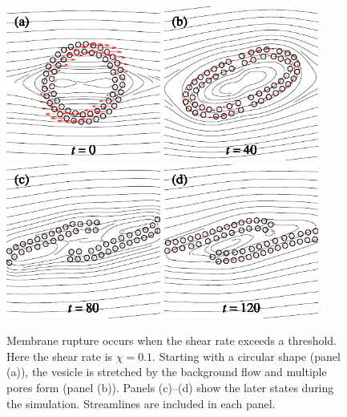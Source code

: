 \documentclass[lineno]{jfm}
\begin{document}
\begin{figure}
\centering
\includegraphics[height=2in]{N58_rupt_0.pdf}
\includegraphics[height=2in]{N58_rupt_200.pdf}
\\
\includegraphics[height=2in]{N58_rupt_400.pdf}
\includegraphics[height=2in]{N58_rupt_600.pdf}
  \caption{\label{figure8} Membrane rupture occurs when the shear rate
  exceeds a threshold. Here the shear rate is $\chi = 0.1$. Starting
  with a circular shape (panel (a)), the vesicle is stretched by the
  background flow and multiple pores form (panel (b)). Panels (c)--(d)
  show the later states during the simulation. Streamlines are included
  in each panel.}
\end{figure}
\end{document}
